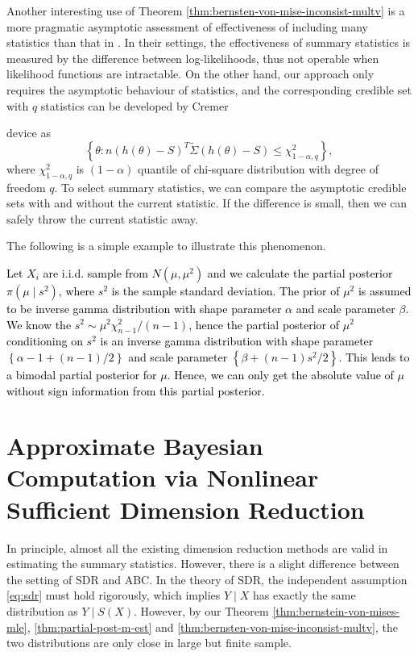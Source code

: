 Another interesting use of Theorem \ref{thm:bernsten-von-mise-inconsist-multv}
is a more pragmatic asymptotic assessment of effectiveness of including {{}
} {many} statistics than that in \citet{joyce2008approximately}.
In their settings, the effectiveness of summary statistics is measured
by the difference between log-likelihoods, thus not operable when
likelihood  {{} functions are} intractable. On the other
hand, our approach only {{} } {requires
}the asymptotic behaviour of statistics, and the corresponding credible
set with $q$ statistics can be developed by Cremer%
\begin{comment}
ask Ghosh
\end{comment}
{} device as 
\[
\left\{ \theta:n\left(h\left(\theta\right)-S\right)^{T}\tilde{\Sigma}\left(h\left(\theta\right)-S\right)\le\chi_{1-\alpha,q}^{2}\right\} ,
\]
where $\chi_{1-\alpha,q}^{2}$ is $\left(1-\alpha\right)$ quantile
of chi-square distribution with degree of freedom $q$. To select
summary statistics, we can compare the asymptotic credible sets with
and without the current statistic. If the difference is small, then
we can safely throw the current statistic away. 

The following is a simple example to illustrate this phenomenon.
\begin{example}
\textcolor{black}{Let $X_{i}$ are i.i.d. sample from $N\left(\mu,\mu^{2}\right)$
and we calculate the partial posterior $\pi\left(\mu\mid s^{2}\right)$,
where $s^{2}$ is the sample standard deviation.  The prior of $\mu^{2}$
is assumed to be inverse gamma distribution with shape parameter $\alpha$
and scale parameter $\beta$. We know the $s^{2}\sim\mu^{2}\chi_{n-1}^{2}/\left(n-1\right)$,
hence the partial posterior of $\mu^{2}$ conditioning on $s^{2}$
is an inverse gamma distribution with shape parameter $\left\{ \alpha-1+\left(n-1\right)/2\right\} $
and scale parameter $\left\{ \beta+\left(n-1\right)s^{2}/2\right\} $.
This leads to a bimodal partial posterior for $\mu$. Hence, we can
only get the absolute value of $\mu$ without sign information from
this partial posterior.}
\end{example}

\section{\label{sec:abc-sdr}Approximate Bayesian Computation {{}
} {via } Nonlinear Sufficient Dimension Reduction}

In principle, almost all the existing dimension reduction methods
are valid in estimating the summary statistics. However, there is
a slight difference between the setting of SDR and ABC. In the theory
of SDR, the independent assumption \ref{eq:sdr} must hold rigorously,
which implies $Y\mid X$ has exactly the same distribution as $Y\mid S\left(X\right)$.
However, by our Theorem \ref{thm:bernstein-von-mises-mle}, \ref{thm:partial-post-m-est}
and \ref{thm:bernsten-von-mise-inconsist-multv}, the two distributions
are only close in large but finite sample. 

